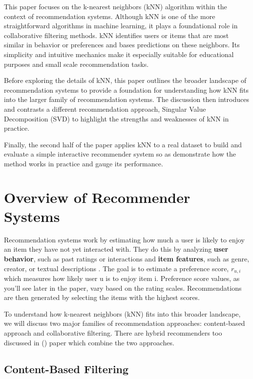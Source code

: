 \documentclass[
  12pt]{article}
\begin{document}
This paper focuses on the k-nearest neighbors (kNN) algorithm within the
context of recommendation systems. Although kNN is one of the more
straightforward algorithms in machine learning, it plays a foundational
role in collaborative filtering methods. kNN identifies users or items
that are most similar in behavior or preferences and bases predictions
on these neighbors. Its simplicity and intuitive mechanics make it
especially suitable for educational purposes and small scale
recommendation tasks.

Before exploring the details of kNN, this paper outlines the broader
landscape of recommendation systems to provide a foundation for
understanding how kNN fits into the larger family of recommendation
systems. The discussion then introduces and contrasts a different
recommendation approach, Singular Value Decomposition (SVD) to highlight
the strengths and weaknesses of kNN in practice.

Finally, the second half of the paper applies kNN to a real dataset to
build and evaluate a simple interactive recommender system so as
demonstrate how the method works in practice and gauge its performance.

\section{\texorpdfstring{\textbf{Overview of Recommender
Systems}}{Overview of Recommender Systems}}\label{overview-of-recommender-systems}

Recommendation systems work by estimating how much a user is likely to
enjoy an item they have not yet interacted with. They do this by
analyzing \textbf{user behavior}, such as past ratings or interactions
and \textbf{item features}, such as genre, creator, or textual
descriptions \citep{ghosh2024}. The goal is to estimate a preference
score, \({r}_{u,i}\) which measures how likely user u is to enjoy item
i. Preference score values, as you'll see later in the paper, vary based
on the rating scales. Recommendations are then generated by selecting
the items with the highest scores\citep{aggarwal2016}.

To understand how k-nearest neighbors (kNN) fits into this broader
landscape, we will discuss two major families of recommendation
approaches: content-based approach and collaborative filtering. There
are hybrid recommenders too discussed in (\citet{apxml2025}) paper which
combine the two approaches.

\subsection{\texorpdfstring{\textbf{Content-Based
Filtering}}{Content-Based Filtering}}\label{content-based-filtering}
\end{document}
